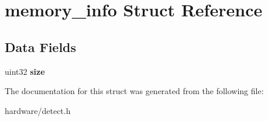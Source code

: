 \hypertarget{structmemory__info}{
\section{memory\_\-info Struct Reference}
\label{structmemory__info}
}
\subsection*{Data Fields}
\begin{DoxyCompactItemize}
\item 
\hypertarget{structmemory__info_ac077bcd966a0f7b5aa4ed74175045cf1}{
uint32 {\bfseries size}}
\label{structmemory__info_ac077bcd966a0f7b5aa4ed74175045cf1}

\end{DoxyCompactItemize}


The documentation for this struct was generated from the following file:\begin{DoxyCompactItemize}
\item 
hardware/detect.h\end{DoxyCompactItemize}
